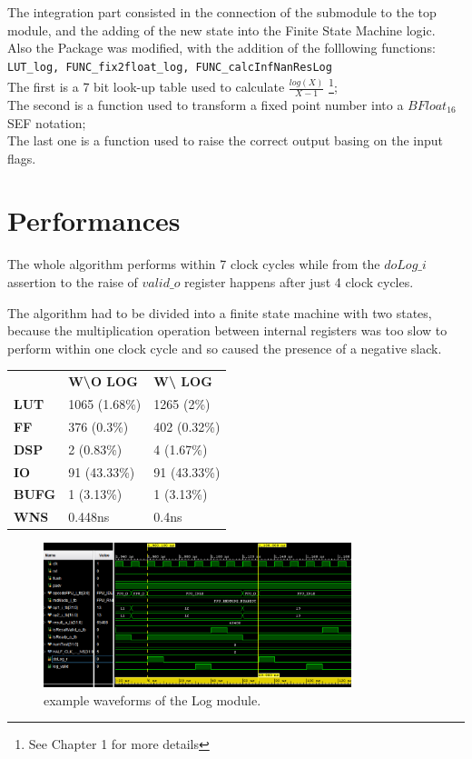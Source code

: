 \documentclass{report}
\begin{document}
The integration part consisted in the connection of the submodule to the top module, and the adding of the new state into the Finite State Machine logic.\\
Also the Package was modified, with the addition of the folllowing functions:\\
\colorbox{mygray}{\lstinline!LUT_log, FUNC_fix2float_log, FUNC_calcInfNanResLog! }
\\The first is a 7 bit look-up table used to calculate $\frac{log(X)}{X-1}$ \footnote{See Chapter 1 for more details};
\\The second is a function used to transform a fixed point number into a $BFloat_{16}$ SEF notation;
\\The last one is a function used to raise the correct output basing on the input flags. 

\section{Performances}

The whole algorithm performs within 7 clock cycles while from the $doLog\_i$ assertion to the raise of $valid\_o$ register happens after just 4 clock cycles.

The algorithm had to be divided into a finite state machine with two states, because the multiplication operation between internal registers was too slow to perform within one clock cycle and so caused the presence of a negative slack.

\begin{table}[htbp]
\centering
\begin{tabular}{lll}
              & \textbf{W\textbackslash{}O LOG} & \textbf{W\textbackslash{} LOG}  \\
\textbf{LUT}  & 1065 (1.68\%)          & 1265 (2\%)             \\
\textbf{FF}   & 376 (0.3\%)			   & 402 (0.32\%)               \\
\textbf{DSP}  & 2 (0.83\%)             & 4 (1.67\%)             \\
\textbf{IO}   & 91 (43.33\%)           & 91 (43.33\%)           \\
\textbf{BUFG} & 1 (3.13\%)             & 1 (3.13\%)             \\
\textbf{WNS}  & 0.448ns                & 0.4ns                 
\end{tabular}
\end{table}


\begin{figure}[h]
  \centering
    \includegraphics[width=0.8\textwidth]{images/waveforms.png}
    \caption{example waveforms of the Log module.}
\end{figure}
\end{document}
